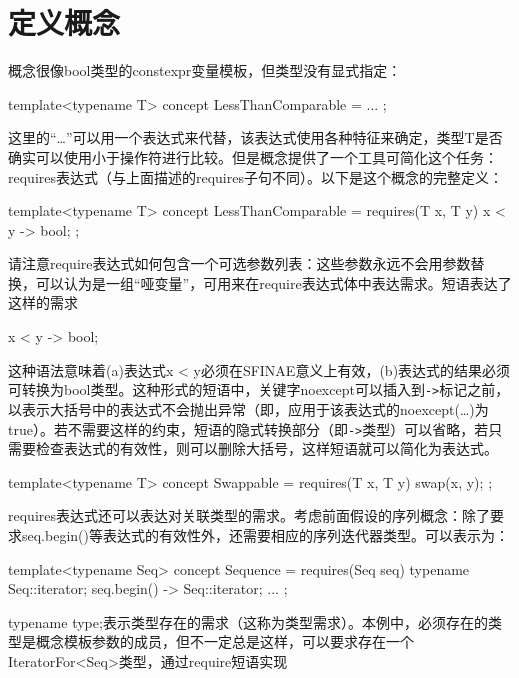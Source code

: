 \section{定义概念}
概念很像bool类型的constexpr变量模板，但类型没有显式指定：

\begin{cpp}
template<typename T> concept LessThanComparable = ... ;
\end{cpp}

这里的“…”可以用一个表达式来代替，该表达式使用各种特征来确定，类型T是否确实可以使用小于操作符进行比较。但是概念提供了一个工具可简化这个任务：requires表达式（与上面描述的requires子句不同）。以下是这个概念的完整定义：

\begin{cpp}
template<typename T>
concept LessThanComparable = requires(T x, T y) {
	{ x < y } -> bool;
};
\end{cpp}

请注意require表达式如何包含一个可选参数列表：这些参数永远不会用参数替换，可以认为是一组“哑变量”，可用来在require表达式体中表达需求。短语表达了这样的需求

\begin{cpp}
{ x < y } -> bool;
\end{cpp}

这种语法意味着(a)表达式x < y必须在SFINAE意义上有效，(b)表达式的结果必须可转换为bool类型。这种形式的短语中，关键字noexcept可以插入到\texttt{->}标记之前，以表示大括号中的表达式不会抛出异常（即，应用于该表达式的noexcept(…)为true）。若不需要这样的约束，短语的隐式转换部分（即\texttt{->}类型）可以省略，若只需要检查表达式的有效性，则可以删除大括号，这样短语就可以简化为表达式。

\begin{cpp}
template<typename T>
concept Swappable = requires(T x, T y) {
	swap(x, y);
};
\end{cpp}

requires表达式还可以表达对关联类型的需求。考虑前面假设的序列概念：除了要求seq.begin()等表达式的有效性外，还需要相应的序列迭代器类型。可以表示为：

\begin{cpp}
template<typename Seq>
concept Sequence = requires(Seq seq) {
	typename Seq::iterator;
	{ seq.begin() } -> Seq::iterator;
	...
};
\end{cpp}

typename type;表示类型存在的需求（这称为类型需求）。本例中，必须存在的类型是概念模板参数的成员，但不一定总是这样，可以要求存在一个IteratorFor<Seq>类型，通过require短语实现

